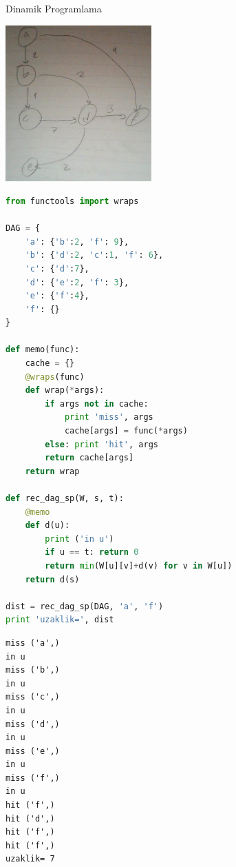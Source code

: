 \documentclass[12pt,fleqn]{article}\usepackage{../common}
\begin{document}
Dinamik Programlama

\includegraphics[height=6cm]{dp1.jpg}

\begin{lstlisting}[language=Python]
from functools import wraps

DAG = {
    'a': {'b':2, 'f': 9},
    'b': {'d':2, 'c':1, 'f': 6},
    'c': {'d':7},
    'd': {'e':2, 'f': 3},
    'e': {'f':4},
    'f': {}
}

def memo(func):
    cache = {}                                  
    @wraps(func)                                
    def wrap(*args):                            
        if args not in cache:
            print 'miss', args
            cache[args] = func(*args)
        else: print 'hit', args
        return cache[args]                      
    return wrap 

def rec_dag_sp(W, s, t):                        
    @memo                                       
    def d(u):
        print ('in u')
        if u == t: return 0                     
        return min(W[u][v]+d(v) for v in W[u])  
    return d(s)                                 

dist = rec_dag_sp(DAG, 'a', 'f')
print 'uzaklik=', dist
\end{lstlisting}

\begin{verbatim}
miss ('a',)
in u
miss ('b',)
in u
miss ('c',)
in u
miss ('d',)
in u
miss ('e',)
in u
miss ('f',)
in u
hit ('f',)
hit ('d',)
hit ('f',)
hit ('f',)
uzaklik= 7
\end{verbatim}
\end{document}
